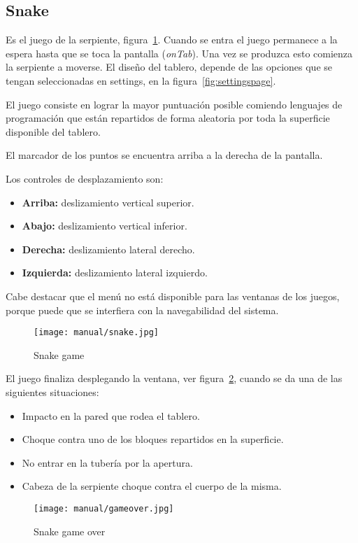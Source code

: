 \subsection{Snake}\label{snake}
Es el juego de la serpiente, figura~\ref{fig:snakepage}. Cuando se entra el juego permanece a la espera hasta que se toca la pantalla (\emph{onTab}). Una vez se produzca esto comienza la serpiente a moverse. El diseño del tablero, depende de las opciones que se tengan seleccionadas en settings, en la figura~\ref{fig:settingspage}.

El juego consiste en lograr la mayor puntuación posible comiendo lenguajes de programación que están repartidos de forma aleatoria por toda la superficie disponible del tablero.

El marcador de los puntos se encuentra arriba a la derecha de la pantalla.

Los controles de desplazamiento son:
\begin{itemize}
	\item \textbf{Arriba:} deslizamiento vertical superior.
	\item \textbf{Abajo:} deslizamiento vertical inferior.
	\item \textbf{Derecha:} deslizamiento lateral derecho.
	\item \textbf{Izquierda:} deslizamiento lateral izquierdo.
\end{itemize}

Cabe destacar que el menú no está disponible para las ventanas de los juegos, porque puede que se interfiera con la navegabilidad del sistema.

\begin{figure}%
	\centering
	\texttt{[image: manual/snake.jpg]}
	\caption{Snake game}\label{fig:snakepage}
\end{figure}

El juego finaliza desplegando la ventana, ver figura~\ref{fig:gameover}, cuando se da una de las siguientes situaciones:
\begin{itemize}
	\item Impacto en la pared que rodea el tablero.
	\item Choque contra uno de los bloques repartidos en la superficie.
	\item No entrar en la tubería por la apertura.
	\item Cabeza de la serpiente choque contra el cuerpo de la misma.
\end{itemize}

\begin{figure}%
	\centering
	\texttt{[image: manual/gameover.jpg]}
	\caption{Snake game over}\label{fig:gameover}
\end{figure}

